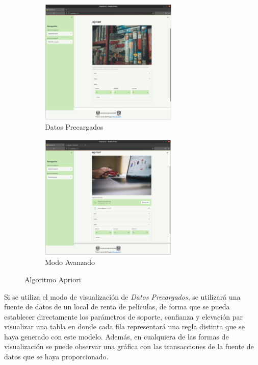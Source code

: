 \documentclass[10pt]{article}
\begin{document}
    \begin{figure}[H]
    
    \begin{subfigure}{0.5\textwidth}
    \centering
    \includegraphics[height=6cm]{img/Apriori_DP.png} 
    \caption{Datos Precargados}
    \label{fig:AprioriDP}
    \end{subfigure}
    \begin{subfigure}{0.5\textwidth}
    \centering
    \includegraphics[height=6cm]{img/AprioriMA.png}
    \caption{Modo Avanzado}
    \label{fig:AprioriMC}
    \end{subfigure}
    
    \caption{Algoritmo Apriori}
    \label{fig:Apriori}
    \end{figure}
    
    Si se utiliza el modo de visualización de \textit{Datos Precargados}, se utilizará una fuente de datos de un local de renta de películas, de forma que se pueda establecer directamente los parámetros de soporte, confianza y elevación par visualizar una tabla en donde cada fila representará una regla distinta que se haya generado con este modelo. Además, en cualquiera de las formas de visualización se puede observar una gráfica con las transacciones de la fuente de datos que se haya proporcionado.
    
\end{document}
